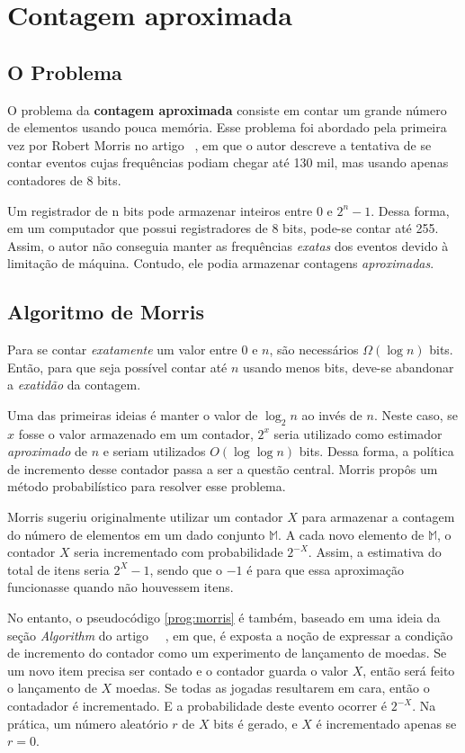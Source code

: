 \chapter{Contagem aproximada}
\label{chap:morris}


\section{O Problema}

O problema da \textbf{contagem aproximada} consiste em contar um grande número de elementos usando pouca memória.  
Esse problema foi abordado pela primeira vez por Robert  Morris no artigo ~\citep{morris:78}, 
em que o autor descreve a tentativa de se contar eventos cujas frequências podiam chegar até 130 mil, mas usando apenas contadores de 8 bits.

Um registrador de n bits pode armazenar inteiros entre $0$ e $2^n-1$. Dessa forma, em um computador que possui registradores de 8 bits, pode-se contar até 255.
Assim, o autor não conseguia manter as frequências \textit{exatas} dos eventos devido à limitação de máquina. 
Contudo, ele podia armazenar contagens \textit{aproximadas}.


\section{Algoritmo de Morris}

Para se contar \textit{exatamente} um valor entre $0$ e $n$, são necessários $\Omega(\log n)$ bits. Então, para que seja possível contar até $n$ usando 
menos bits, deve-se abandonar a \textit{exatidão} da contagem.

Uma das primeiras ideias é manter o valor de $\log_2 n$ ao invés de $n$. 
Neste caso, se $x$ fosse o valor armazenado em um contador, $2^x$ seria utilizado como estimador \textit{aproximado} de $n$
e seriam utilizados $O(\log \log n)$ bits.
Dessa forma, a política de incremento desse contador passa a ser a questão central.
Morris propôs um método probabilístico para resolver esse problema.

Morris sugeriu originalmente utilizar um contador $X$ para armazenar a contagem do número de elementos em um dado conjunto $\mathbb{M}$.
A cada novo elemento de $\mathbb{M}$, o contador $X$ seria incrementado com probabilidade $2^{-X}$.
Assim, a estimativa do total de itens seria $2^{X} - 1$, sendo que o $-1$ é para que essa aproximação funcionasse quando não houvessem itens.

No entanto, o pseudocódigo \ref{prog:morris} é também, baseado em uma ideia da seção \textit{Algorithm} do artigo ~~\citep{ApproximateCountingAlgorithm}, 
em que, é exposta a noção de expressar a condição de incremento do contador como um experimento de lançamento de moedas. 
Se um novo item precisa ser contado e o contador guarda o valor $X$, então será feito o lançamento de $X$ moedas. Se todas as jogadas resultarem em cara, então o contadador é incrementado.
E a probabilidade deste evento ocorrer é $2^{-X}$. Na prática, um número aleatório $r$ de $X$ bits é gerado, e $X$ é incrementado apenas se $r = 0$.

